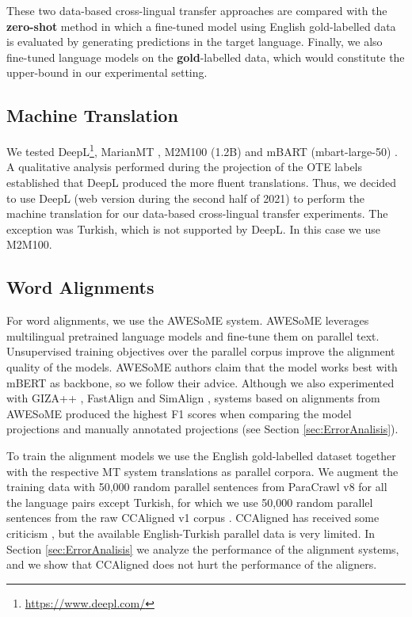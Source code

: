 \documentclass[11pt]{article}
\begin{document}
These two data-based cross-lingual transfer approaches are compared with the \textbf{zero-shot} method in which a fine-tuned model using English gold-labelled data is evaluated by generating predictions in the target language. Finally, we also fine-tuned language models on the \textbf{gold}-labelled data, which would constitute the upper-bound in our experimental setting.

\subsection{Machine Translation}

We tested DeepL\footnote{\url{https://www.deepl.com/}}, MarianMT \cite{mariannmt,tiedemann-thottingal-2020-opus},  M2M100 (1.2B) \cite{DBLP:journals/corr/abs-2010-11125} and mBART (mbart-large-50) \cite{DBLP:journals/corr/abs-2008-00401}. A qualitative analysis performed during the projection of the OTE labels established that DeepL produced the more fluent translations. Thus, we decided to use DeepL (web version during the second half of 2021) to perform the machine translation for our data-based cross-lingual transfer experiments. The exception was Turkish, which is not supported by DeepL. In this case we use M2M100. 


\subsection{Word Alignments}

For word alignments, we use the AWESoME \cite{DBLP:journals/corr/abs-2101-08231} system. AWESoME leverages multilingual pretrained language models and fine-tune them on parallel text. Unsupervised training objectives over the parallel corpus improve the alignment quality of the models. AWESoME authors claim that the model works best with mBERT \cite{DBLP:conf/naacl/DevlinCLT19} as backbone, so we follow their advice. Although we also experimented with GIZA++ \cite{och-ney-2003-systematic}, FastAlign \cite{fastalign} and SimAlign \cite{jalili-sabet-etal-2020-simalign}, systems based on alignments from AWESoME produced the highest F1 scores when comparing the model projections and manually annotated projections (see Section \ref{sec:ErrorAnalisis}).












To train the alignment models we use the English gold-labelled dataset together with the respective MT system translations as parallel corpora. We augment the training data with 50,000 random parallel sentences from ParaCrawl v8 \cite{espla-etal-2019-paracrawl} for all the language pairs except Turkish, for which we use 50,000 random parallel sentences from the raw CCAligned v1 corpus \cite{elkishky_ccaligned_2020}.  CCAligned has received some criticism \cite{10.1162/tacl_a_00447}, but the available English-Turkish parallel data is very limited. In Section \ref{sec:ErrorAnalisis} we analyze the performance of the alignment systems, and we show that CCAligned does not hurt the performance of the aligners.
\end{document}
